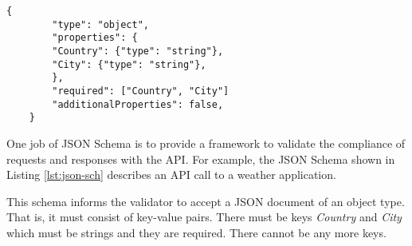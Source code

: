 \begin{lstlisting}[caption = {A JSON Schema that describes an API call structure to validate the integrity of a request.}, captionpos = b, label = lst:json-sch]
    {
        "type": "object",
        "properties": {
        "Country": {"type": "string"},
        "City": {"type": "string"},
        },
        "required": ["Country", "City"]
        "additionalProperties": false,
    }
\end{lstlisting}

One job of JSON Schema is to provide a framework to validate the compliance of
requests and responses with the API. For example, the JSON Schema shown in
Listing \ref{lst:json-sch} describes an API call to a weather application.

This schema informs the validator to accept a JSON document of an object type.
That is, it must consist of key-value pairs. There must be keys \emph{Country}
and \emph{City} which must be strings and they are required. There cannot be any
more keys.
